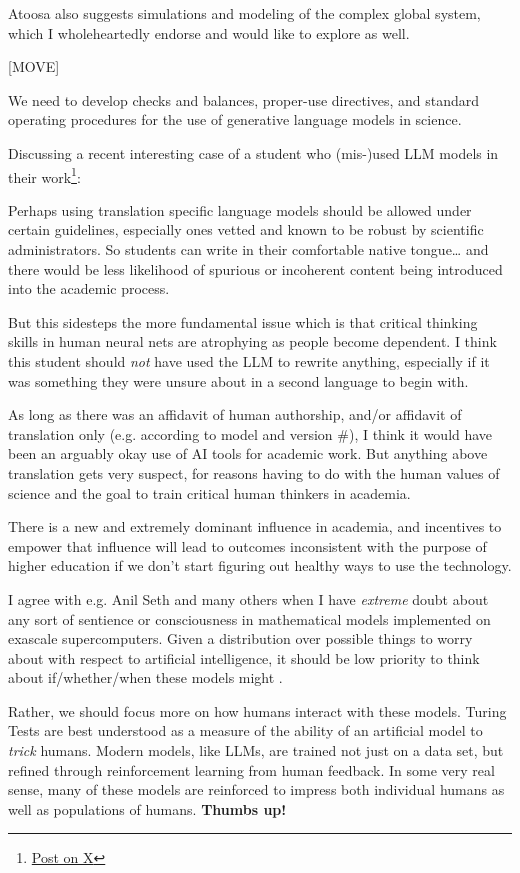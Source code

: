 \documentclass[11pt, oneside]{article}   	%
\begin{document}
Atoosa also suggests simulations and modeling of the complex global system, which I wholeheartedly endorse and would like to explore as well.  



[MOVE]

We need to develop checks and balances, proper-use directives, and standard operating procedures for the use of generative language models in science.

Discussing a recent interesting case of a student who (mis-)used LLM models in their work\footnote{\href{https://twitter.com/BeebsMemes/status/1759282741680443600}{Post on X}}:

Perhaps using translation specific language models should be allowed under certain guidelines, especially ones vetted and known to be robust by scientific administrators. So students can write in their comfortable native tongue… and there would be less likelihood of spurious or incoherent content being introduced into the academic process.

But this sidesteps the more fundamental  issue which is that critical thinking skills in human neural nets are atrophying as people become dependent.  I think this student should \emph{not} have used the LLM to rewrite anything, especially if it was something they were unsure about in a second language to begin with. 

As long as there was an affidavit of human authorship, and/or affidavit of translation only (e.g. according to model and version \#), I think it would have been an arguably okay use of AI tools for academic work. But anything above translation gets very suspect, for reasons having to do with the human values of science and the goal to train critical human thinkers in academia.

There is a new and extremely dominant influence in academia, and incentives to empower that influence will lead to outcomes inconsistent with the purpose of higher education if we don’t start figuring out healthy ways to use the technology.

I agree with e.g. Anil Seth and many others when I have \emph{extreme} doubt about any sort of sentience or consciousness in mathematical models implemented on exascale supercomputers.  Given a distribution over possible things to worry about with respect to artificial intelligence, it should be low priority to think about if/whether/when these models might .

Rather, we should focus more on how humans interact with these models.  Turing Tests are best understood as a measure of the ability of an artificial model to \emph{trick} humans.  Modern models, like LLMs, are trained not just on a data set, but refined through reinforcement learning from human feedback. In some very real sense, many of these models are reinforced to impress both individual humans as well as populations of humans.  \textbf{Thumbs up!}
\end{document}
